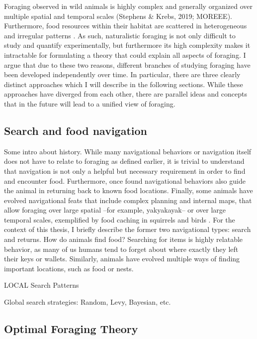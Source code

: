 Foraging observed in wild animals is highly complex and generally organized over multiple spatial and temporal scales \needscite(Stephens \& Krebs, 2019; MOREEE). Furthermore, food resources within their habitat are scattered in heterogeneous and irregular patterns \needscite. As such, naturalistic foraging is not only difficult to study and quantify experimentally, but furthermore its high complexity makes it intractable for formulating a theory that could explain all aspects of foraging. I argue that due to these two reasons, different branches of studying foraging have been developed independently over time. In particular, there are three clearly distinct approaches which I will describe in the following sections. While these approaches have diverged from each other, there are parallel ideas and concepts that in the future will lead to a unified view of foraging.

\subsection{Search and food navigation}
\label{sub:searchnavigation}

Some intro about history. While many navigational behaviors or navigation itself does not have to relate to foraging as defined earlier, it is trivial to understand that navigation is not only a helpful but necessary requirement in order to find and encounter food. Furthermore, once found navigational behaviors also guide the animal in returning back to known food locations. Finally, some animals have evolved navigational feats that include complex planning and internal maps, that allow foraging over large spatial --for example, yakyakayak-- or over large temporal scales, exemplified by food caching in squirrels \needscite and birds \needscite. For the context of this thesis, I briefly describe the former two navigational types:  search and returns.
How do animals find food? Searching for items is highly relatable behavior, as many of us humans tend to forget about where exactly they left their keys or wallets. Similarly, animals have evolved multiple ways of finding important locations, such as food or nests.

LOCAL Search Patterns

Global search strategies: Random, Levy, Bayesian, etc.

\subsection{Optimal Foraging Theory}
\label{sub:optimalforaging}

